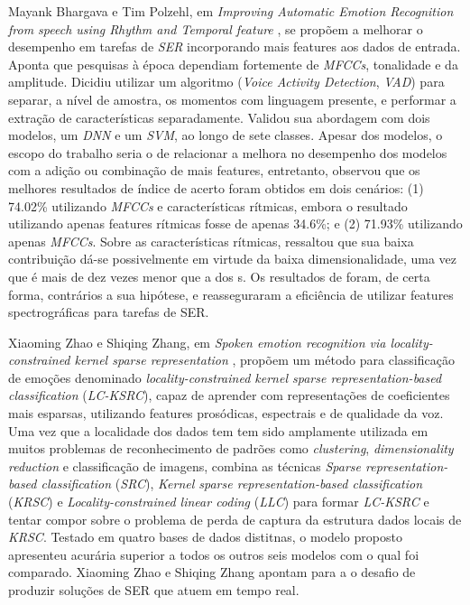 Mayank Bhargava e Tim Polzehl, em \textit{Improving Automatic Emotion Recognition from speech using Rhythm and Temporal feature} \cite{11}, se propõem a melhorar o desempenho em tarefas de \textit{SER} incorporando mais features aos dados de entrada. Aponta que pesquisas à época dependiam fortemente de \textit{MFCCs}, tonalidade e da amplitude. Dicidiu utilizar um algoritmo (\textit{Voice Activity Detection}, \textit{VAD}) para separar, a nível de amostra, os momentos com linguagem presente, e performar a extração de características separadamente. Validou sua abordagem com dois modelos, um \textit{DNN} e um \textit{SVM}, ao longo de sete classes. Apesar dos modelos, o escopo do trabalho seria o de relacionar a melhora no desempenho dos modelos com a adição ou combinação de mais features, entretanto, observou que os melhores resultados de índice de acerto foram obtidos em dois cenários: (1) 74.02\% utilizando \textit{MFCCs} e características rítmicas, embora o resultado utilizando apenas features rítmicas fosse de apenas 34.6\%; e (2) 71.93\% utilizando apenas \textit{MFCCs}. Sobre as características rítmicas, ressaltou que sua baixa contribuição dá-se possivelmente em virtude da baixa dimensionalidade, uma vez que é mais de dez vezes menor que a dos s. Os resultados de \cite{11} foram, de certa forma, contrários a sua hipótese, e reasseguraram a eficiência de utilizar features spectrográficas para tarefas de SER.

Xiaoming Zhao e Shiqing Zhang, em\textit{ Spoken emotion recognition via locality-constrained kernel sparse representation }\cite{32.31}, propõem um método para classificação de emoções denominado \textit{locality-constrained kernel sparse representation-based classification} (\textit{LC-KSRC}), capaz de aprender com representações de coeficientes mais esparsas, utilizando features prosódicas, espectrais e de qualidade da voz. Uma vez que a localidade dos dados tem tem sido amplamente utilizada em muitos problemas de reconhecimento de padrões como \textit{clustering}, \textit{dimensionality reduction} e classificação de imagens, \cite{32.31} combina as técnicas \textit{Sparse representation-based classification} (\textit{SRC}), \textit{Kernel sparse representation-based classification} (\textit{KRSC}) e \textit{Locality-constrained linear coding} (\textit{LLC}) para formar \textit{LC-KSRC} e tentar compor sobre o problema de perda de captura da estrutura dados locais de \textit{KRSC}. Testado em quatro bases de dados distitnas, o modelo proposto apresenteu acurária superior a todos os outros seis modelos com o qual foi comparado. Xiaoming Zhao e Shiqing Zhang apontam para a o desafio de produzir soluções de SER que atuem em tempo real.


